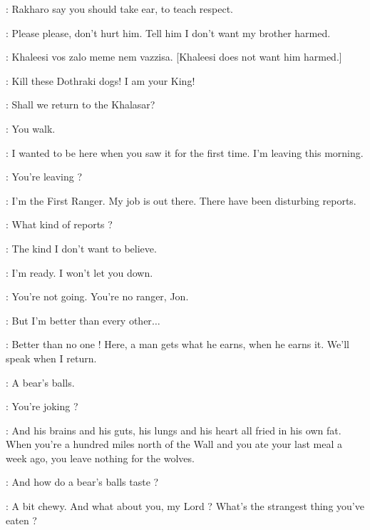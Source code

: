 \IRRI: Rakharo say you should take ear, to teach respect. 

\DAENERYS: Please please, don't hurt him. Tell him I don't want my brother harmed. 

\IRRI: Khaleesi vos zalo meme nem vazzisa. [Khaleesi does not want him harmed.]


\VISERYS:  Kill these Dothraki dogs! I am your King! 

\JORAH:  Shall we return to the Khalasar? 

\RAKHARO:  You walk. 

\scene



\BENJEN: I wanted to be here when you saw it for the first time. I'm leaving this morning. 

\JON: You're leaving ? 

\BENJEN: I'm the First Ranger. My job is out there. There have been disturbing reports. 

\JON: What kind of reports ? 

\BENJEN: The kind I don't want to believe. 

\JON: I'm ready. I won't let you down. 

\BENJEN: You're not going. You're no ranger, Jon. 

\JON: But I'm better than every other$\ldots$ 

\BENJEN: Better than no one ! Here, a man gets what he earns, when he earns it. We'll speak when I return. 

\scene


\YOREN: A bear's balls. 

\TYRION: You're joking ? 

\YOREN: And his brains and his guts, his lungs and his heart all fried in his own fat. When you're a hundred miles north of the Wall and you ate your last meal a week ago, you leave nothing for the wolves. 

\TYRION: And how do a bear's balls taste ? 

\YOREN: A bit chewy. And what about you, my Lord ? What's the strangest thing you've eaten ? 

